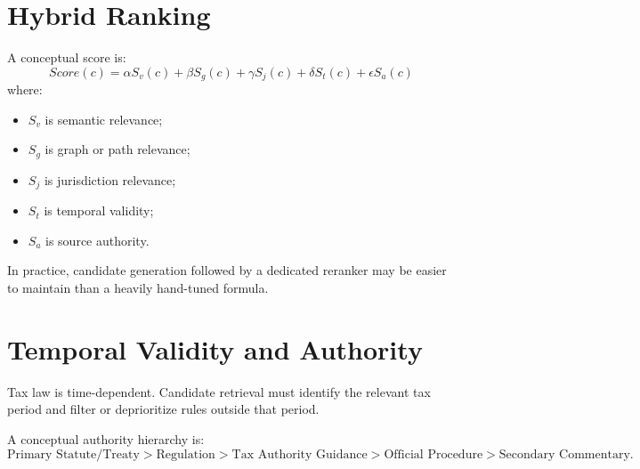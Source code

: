 \documentclass[11pt,a4paper]{article}
\begin{document}
\section{Hybrid Ranking}
A conceptual score is:
\[
Score(c)=\alpha S_v(c)+\beta S_g(c)+\gamma S_j(c)+\delta S_t(c)+\epsilon S_a(c)
\]
where:
\begin{itemize}
\item $S_v$ is semantic relevance;
\item $S_g$ is graph or path relevance;
\item $S_j$ is jurisdiction relevance;
\item $S_t$ is temporal validity;
\item $S_a$ is source authority.
\end{itemize}
In practice, candidate generation followed by a dedicated reranker may be easier to maintain than a heavily hand-tuned formula.

\section{Temporal Validity and Authority}
Tax law is time-dependent. Candidate retrieval must identify the relevant tax period and filter or deprioritize rules outside that period.
\begin{center}
\end{center}
A conceptual authority hierarchy is:
\[
\text{Primary Statute/Treaty}
>
\text{Regulation}
>
\text{Tax Authority Guidance}
>
\text{Official Procedure}
>
\text{Secondary Commentary}.
\]
\end{document}
